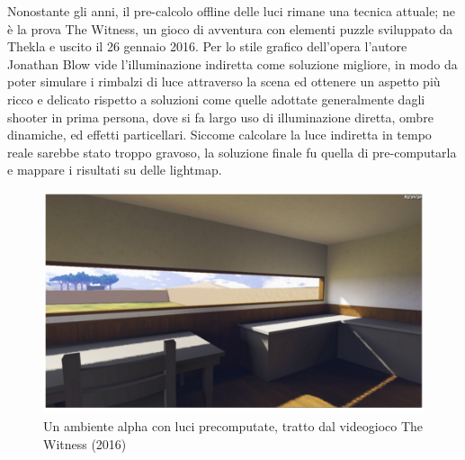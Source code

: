 Nonostante gli anni, il pre-calcolo offline delle luci rimane una tecnica attuale; ne è la prova The Witness, un gioco di avventura con elementi puzzle sviluppato da Thekla e uscito il 26 
gennaio 2016. Per lo stile grafico dell’opera l’autore Jonathan Blow vide l’illuminazione indiretta come soluzione migliore, in modo da poter simulare i rimbalzi di luce attraverso la scena ed ottenere un aspetto più ricco e delicato rispetto a soluzioni come quelle adottate generalmente dagli shooter in prima persona, dove si fa largo uso di illuminazione diretta, ombre dinamiche, ed effetti particellari. Siccome calcolare la luce indiretta in tempo reale sarebbe stato troppo gravoso, la soluzione finale fu quella di pre-computarla e mappare i risultati su delle   lightmap.	
\\
\begin{figure}[htb]
 \centering
 \includegraphics[width=0.8\linewidth]{images/chapter_stato_arte/stato_arte_lightmap_witness.png}\hfill
 \caption[Lightmap The Witness]{Un ambiente alpha con luci precomputate, tratto dal videogioco The Witness (2016)}
 \label{fig:stato_arte_lightmap_witness}
\end{figure}
